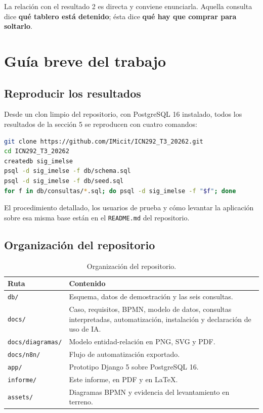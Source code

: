 \documentclass[10pt,letterpaper]{article}
\begin{document}
La relación con el resultado 2 es directa y conviene enunciarla. Aquella
consulta dice \textbf{qué tablero está detenido}; ésta dice \textbf{qué hay que
comprar para soltarlo}.


\newpage

\section{Guía breve del trabajo}

\subsection{Reproducir los resultados}

Desde un clon limpio del repositorio, con PostgreSQL 16 instalado, todos los
resultados de la sección 5 se reproducen con cuatro comandos:

\begin{lstlisting}[language=bash]
git clone https://github.com/IMicit/ICN292_T3_20262.git
cd ICN292_T3_20262
createdb sig_imelse
psql -d sig_imelse -f db/schema.sql
psql -d sig_imelse -f db/seed.sql
for f in db/consultas/*.sql; do psql -d sig_imelse -f "$f"; done
\end{lstlisting}

El procedimiento detallado, los usuarios de prueba y cómo levantar la
aplicación sobre esa misma base están en el \texttt{README.md} del repositorio.

\subsection{Organización del repositorio}

\begin{table}[H]
\centering
\small
\begin{tabular}{@{}p{3.4cm}p{11.6cm}@{}}
\toprule
\textbf{Ruta} & \textbf{Contenido} \\
\midrule
\texttt{db/} & Esquema, datos de demostración y las seis consultas. \\
\texttt{docs/} & Caso, requisitos, BPMN, modelo de datos, consultas interpretadas, automatización, instalación y declaración de uso de IA. \\
\texttt{docs/diagramas/} & Modelo entidad-relación en PNG, SVG y PDF. \\
\texttt{docs/n8n/} & Flujo de automatización exportado. \\
\texttt{app/} & Prototipo Django 5 sobre PostgreSQL 16. \\
\texttt{informe/} & Este informe, en PDF y en \LaTeX. \\
\texttt{assets/} & Diagramas BPMN y evidencia del levantamiento en terreno. \\
\bottomrule
\end{tabular}
\caption{Organización del repositorio.}
\end{table}
\end{document}
